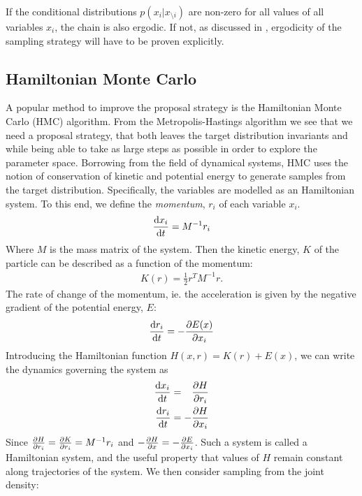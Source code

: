 If the conditional distributions $p(x_i|x_{\setminus i})$ are non-zero for all values of all variables $x_i$, the chain is also ergodic.
If not, as discussed in \cite{bishop_pattern_2006}, ergodicity of the sampling strategy will have to be proven explicitly.

\subsection{Hamiltonian Monte Carlo}

A popular method to improve the proposal strategy is the Hamiltonian Monte Carlo (HMC) algorithm. 
From the Metropolis-Hastings algorithm we see that we need a proposal strategy, that both leaves the target distribution invariants and while being able to take as large steps as possible in order to explore the parameter space.
Borrowing from the field of dynamical systems, HMC uses the notion of conservation of kinetic and potential energy to generate samples from the target distribution. 
Specifically, the variables are modelled as an Hamiltonian system.
To this end, we define the \emph{momentum}, $r_i$ of each variable $x_i$.
\begin{align*}
    \dv{x_i}{t} = M^{-1} r_i
\end{align*}
Where $M$ is the mass matrix of the system.
Then the kinetic energy, $K$ of the particle can be described as a function of the momentum:
\begin{align*}
    K(r) = \frac{1}{2}r^T M^{-1} r.
\end{align*}
The rate of change of the momentum, ie. the acceleration is given by the negative gradient of the potential energy, $E$:
\begin{align*}
    \dv{r_i}{t} = -\pdv{E(x)}{x_i}
\end{align*}
Introducing the Hamiltonian function $H(x, r) = K(r) + E(x)$, we can write the dynamics governing the system as
\begin{equation}\label{eq:hmc-dynamics}
    \begin{aligned}
        \dv{x_i}{t} &= \phantom{-}\pdv{H}{r_i}\\
        \dv{r_i}{t} &= -\pdv{H}{x_i}
    \end{aligned}
\end{equation}
Since $\pdv{H}{r_i} = \pdv{K}{r_i} = M^{-1}r_i$ and $-\pdv{H}{x} = -\pdv{E}{x_i}$. 
Such a system is called a Hamiltonian system, and the useful property that values of $H$ remain constant along trajectories of the system.
We then consider sampling from the joint density:
